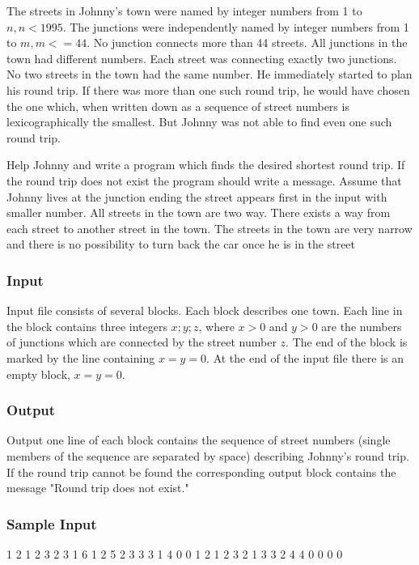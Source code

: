 The streets in Johnny's town were named by integer numbers from 1 to $n, n < 1995$. The junctions were independently named by integer numbers from 1 to $m, m <= 44$. No junction connects more than 44 streets. All junctions in the town had different numbers. Each street was connecting exactly two junctions. No two streets in the town had the same number. He immediately started to plan his round trip. If there was more than one such round trip, he would have chosen the one which, when written down as a sequence of street numbers is lexicographically the smallest. But Johnny was not able to find even one such round trip.

Help Johnny and write a program which finds the desired shortest round trip. If the round trip does not exist the program should write a message. Assume that Johnny lives at the junction ending the street appears first in the input with smaller number. All streets in the town are two way. There exists a way from each street to another street in the town. The streets in the town are very narrow and there is no possibility to turn back the car once he is in the street


\subsubsection{Input}
Input file consists of several blocks. Each block describes one town. Each line in the block contains three integers $x; y; z$, where $x > 0$ and $y > 0$ are the numbers of junctions which are connected by the street number $z$. The end of the block is marked by the line containing $x = y = 0$. At the end of the input file there is an empty block, $x = y = 0$.


\subsubsection{Output}
Output one line of each block contains the sequence of street numbers (single members of the sequence are separated by space) describing Johnny's round trip. If the round trip cannot be found the corresponding output block contains the message "Round trip does not exist."


\subsubsection{Sample Input}
\begin{Code}
    1 2 1
    2 3 2
    3 1 6
    1 2 5
    2 3 3
    3 1 4
    0 0
    1 2 1
    2 3 2
    1 3 3
    2 4 4
    0 0
    0 0
\end{Code}

